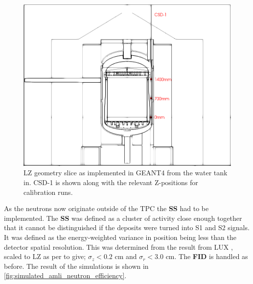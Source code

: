 \begin{figure}[]
\centering
\includegraphics[width=\textwidth]{Figures/Geometry/csd1_geometry_black_and_white.png}
\caption{LZ geometry slice as implemented in GEANT4 from the water tank in. CSD-1 is shown along with the relevant Z-positions for calibration runs.}
\label{fig:CSD1_Geometry}
\end{figure}


\par
As the neutrons now originate outside of the TPC the \textbf{SS} had to be implemented.
The \textbf{SS} was defined as a cluster of activity close enough together that it cannot be distinguished if the deposits were turned into S1 and S2 signals.
It was defined as the energy-weighted variance in position being less than the detector spatial resolution.
This was determined from the result from LUX \cite{lux_position_reconstruction_ref}, scaled to LZ as per \cite{LZ_TechnicalDesignReview_ref} to give; ${\sigma}_{z}<0.2$ cm and ${\sigma}_{r}<3.0$ cm.
The \textbf{FID} is handled as before.
The result of the simulations is shown in \autoref{fig:simulated_amli_neutron_efficiency}.



